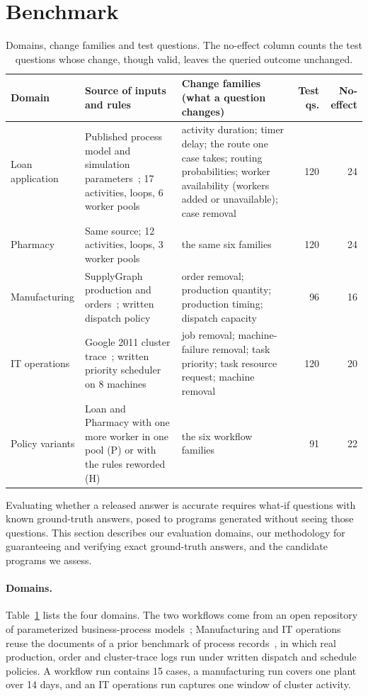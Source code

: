 \section{Benchmark}
\label{sec:benchmark}

\begin{table}[t]
\centering
\caption{Domains, change families and test questions. The no-effect column counts the test questions whose change, though valid, leaves the queried outcome unchanged.}
\label{tab:benchmark}
\footnotesize
\begin{tabular}{@{}l p{4.6cm} p{6.6cm} r r@{}}
\toprule
Domain & Source of inputs and rules & Change families (what a question changes) & Test qs. & No-effect \\
\midrule
Loan application & Published process model and simulation parameters~\cite{chapela2023zenodo}; 17 activities, loops, 6 worker pools & activity duration; timer delay; the route one case takes; routing probabilities; worker availability (workers added or unavailable); case removal & 120 & 24 \\
Pharmacy & Same source; 12 activities, loops, 3 worker pools & the same six families & 120 & 24 \\
Manufacturing & SupplyGraph production and orders~\cite{wasi2024supplygraph}; written dispatch policy~\cite{otftools2026} & order removal; production quantity; production timing; dispatch capacity & 96 & 16 \\
IT operations & Google 2011 cluster trace~\cite{reiss2011google}; written priority scheduler on 8 machines~\cite{otftools2026} & job removal; machine-failure removal; task priority; task resource request; machine removal & 120 & 20 \\
\midrule
Policy variants & Loan and Pharmacy with one more worker in one pool (P) or with the rules reworded (H) & the six workflow families & 91 & 22 \\
\bottomrule
\end{tabular}
\end{table}


Evaluating whether a released answer is accurate requires what-if questions with known ground-truth answers, posed to programs generated without seeing those questions. This section describes our evaluation domains, our methodology for guaranteeing and verifying exact ground-truth answers, and the candidate programs we assess.

\paragraph{Domains.} Table~\ref{tab:benchmark} lists the four domains. The two workflows come from an open repository of parameterized business-process models~\cite{chapela2023zenodo,chapela2024extraneous}; Manufacturing and IT operations reuse the documents of a prior benchmark of process records~\cite{otftools2026}, in which real production, order and cluster-trace logs run under written dispatch and schedule policies. A workflow run contains 15 cases, a manufacturing run covers one plant over 14 days, and an IT operations run captures one window of cluster activity.

